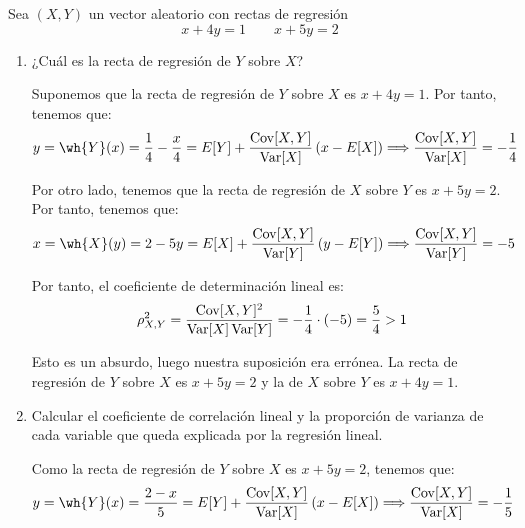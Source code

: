 \begin{ejercicio}
    Sea $(X,Y)$ un vector aleatorio con rectas de regresión
    \begin{equation*}
        x+4y = 1 \qquad x+5y = 2
    \end{equation*}
    \begin{enumerate}
        \item ¿Cuál es la recta de regresión de $Y$ sobre $X$?
        
        Suponemos que la recta de regresión de $Y$ sobre $X$ es $x+4y=1$. Por tanto, tenemos que:
        \begin{equation*}
            y=\wh{Y}(x) = \dfrac{1}{4}-\dfrac{x}{4} = E[Y] + \dfrac{\Cov[X,Y]}{\Var[X]}\left(x-E[X]\right)
            \Longrightarrow
            \dfrac{\Cov[X,Y]}{\Var[X]} = -\dfrac{1}{4}
        \end{equation*}

        Por otro lado, tenemos que la recta de regresión de $X$ sobre $Y$ es $x+5y=2$. Por tanto, tenemos que:
        \begin{equation*}
            x=\wh{X}(y) = 2-5y = E[X] + \dfrac{\Cov[X,Y]}{\Var[Y]}\left(y-E[Y]\right)
            \Longrightarrow
            \dfrac{\Cov[X,Y]}{\Var[Y]} = -5
        \end{equation*}

        Por tanto, el coeficiente de determinación lineal es:
        \begin{equation*}
            \rho_{X,Y}^2 = \dfrac{\operatorname{Cov}[X,Y]^2}{\operatorname{Var}[X]\operatorname{Var}[Y]} = -\dfrac{1}{4}\cdot (-5) = \dfrac{5}{4}>1
        \end{equation*}

        Esto es un absurdo, luego nuestra suposición era errónea. La recta de regresión de $Y$ sobre $X$ es $x+5y=2$ y la de $X$ sobre $Y$ es $x+4y=1$.
        
        
        \item Calcular el coeficiente de correlación lineal y la proporción de varianza de cada variable que queda explicada por la regresión lineal.
        
        Como la recta de regresión de $Y$ sobre $X$ es $x+5y=2$, tenemos que:
        \begin{equation*}
            y=\wh{Y}(x) = \dfrac{2-x}{5} = E[Y] + \dfrac{\Cov[X,Y]}{\Var[X]}\left(x-E[X]\right)
            \Longrightarrow
            \dfrac{\Cov[X,Y]}{\Var[X]} = -\dfrac{1}{5}
        \end{equation*}


\end{enumerate}
\end{ejercicio}
